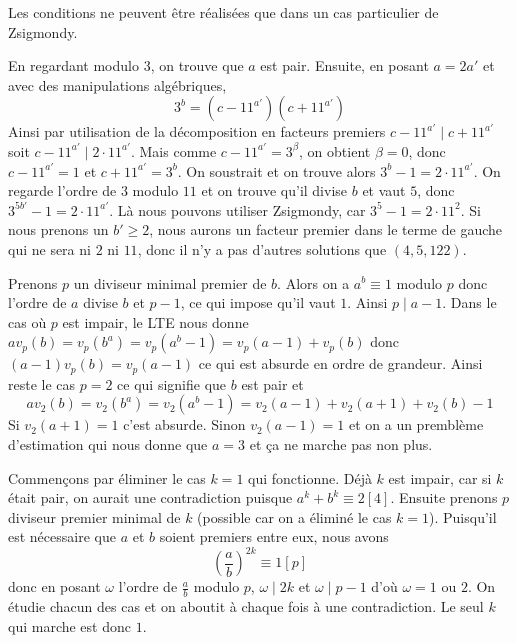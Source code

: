 \begin{sol}
Les conditions ne peuvent être réalisées que dans un cas particulier de Zsigmondy.
\end{sol}


\begin{sol}
En regardant modulo $3$, on trouve que $a$ est pair. Ensuite, en posant $a=2a'$ et avec des manipulations algébriques,
$$3^b=(c-11^{a'})(c+11^{a'})$$
Ainsi par utilisation de la décomposition en facteurs premiers $c-11^{a'}\mid c+11^{a'}$ soit $c-11^{a'}\mid 2\cdot 11^{a'}$.\newline
Mais comme $c-11^{a'}=3^\beta$, on obtient $\beta=0$, donc $c-11^{a'}=1$ et $c+11^{a'}=3^b$.\newline
On soustrait et on trouve alors
$3^b-1=2\cdot 11^{a'}$. On regarde l'ordre de $3$ modulo $11$ et on trouve qu'il divise $b$ et vaut $5$, donc $3^{5b'}-1=2\cdot 11^{a'}$. Là nous pouvons utiliser Zsigmondy, car $3^5-1=2\cdot 11^2$. Si nous prenons un $b'\ge 2$, nous aurons un facteur premier dans le terme de gauche qui ne sera ni $2$ ni $11$, donc il n'y a pas d'autres solutions que $(4,5,122)$.
\end{sol}


\begin{sol}
Prenons $p$ un diviseur minimal premier de $b$. Alors on a $a^b\equiv 1$ modulo $p$ donc l'ordre de $a$ divise $b$ et $p-1$, ce qui impose qu'il vaut $1$. Ainsi $p\mid a-1$.
Dans le cas où $p$ est impair,
le LTE nous donne $av_p(b)=v_p(b^a)=v_p(a^b-1)=v_p(a-1)+v_p(b)$ donc $(a-1)v_p(b)=v_p(a-1)$ ce qui est absurde en ordre de grandeur.
Ainsi reste le cas $p=2$ ce qui signifie que $b$ est pair et
$$av_2(b)=v_2(b^a)=v_2(a^b-1)=v_2(a-1)+v_2(a+1)+v_2(b)-1$$
Si $v_2(a+1)=1$ c'est absurde. Sinon $v_2(a-1)=1$ et on a un premblème d'estimation qui nous donne que $a=3$ et ça ne marche pas non plus.
\end{sol}


\begin{sol}
Commençons par éliminer le cas $k=1$ qui fonctionne.
Déjà $k$ est impair, car si $k$ était pair, on aurait une contradiction puisque $a^k+b^k\equiv 2[4]$. Ensuite prenons $p$ diviseur premier minimal de $k$ (possible car on a éliminé le cas $k=1$). Puisqu'il est nécessaire que $a$ et $b$ soient premiers entre eux, nous avons
$$\left(\frac ab\right)^{2k}\equiv 1[p]$$
donc en posant $\omega$ l'ordre de $\frac ab$ modulo $p$, $\omega\mid 2k$ et $\omega\mid p-1$ d'où $\omega=1$ ou $2$. On étudie chacun des cas et on aboutit à chaque fois à une contradiction.\newline
Le seul $k$ qui marche est donc $1$.
\end{sol}


